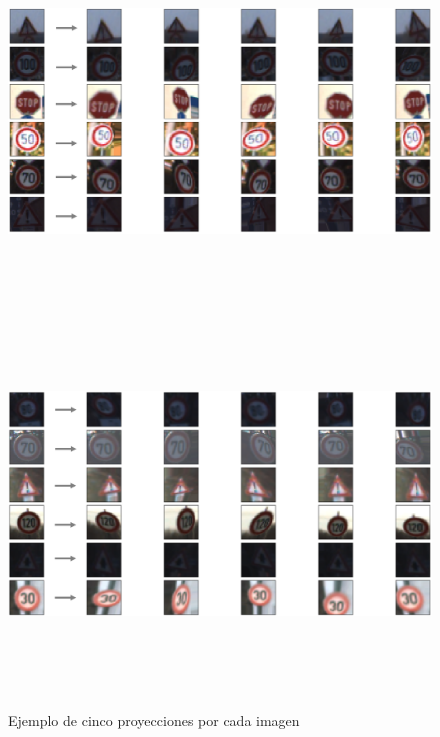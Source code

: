 		\begin{figure}[H]
			\begin{center}
			\includegraphics[width=1\textwidth,height=10cm]{images/desarrollo/Augment/projection_transform2}
			\includegraphics[width=1\textwidth,height=10cm]{images/desarrollo/Augment/projection_transform}
			\end{center}
			\begin{center}
			\vspace{1em}
			\caption{\small{Ejemplo de cinco proyecciones por cada imagen}}
			\vspace{-1em}
		{\small{\fontsize{10}{16.8}\selectfont {Fuente propia}}}
			\end{center}
			\vspace{-1.5em}
		\end{figure}

